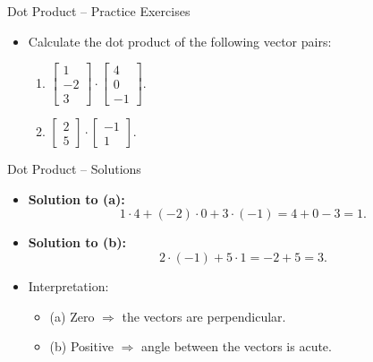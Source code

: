 \documentclass{beamer}
\begin{document}
\begin{frame}{Dot Product – Practice Exercises}
  \begin{itemize}
    \item Calculate the dot product of the following vector pairs:
    \begin{enumerate}
      \item $\begin{bmatrix} 1 \\ -2 \\ 3 \end{bmatrix} \cdot \begin{bmatrix} 4 \\ 0 \\ -1 \end{bmatrix}.$
      \item $\begin{bmatrix} 2 \\ 5 \end{bmatrix} \cdot \begin{bmatrix} -1 \\ 1 \end{bmatrix}.$
    \end{enumerate}
  \end{itemize}
\end{frame}

\begin{frame}{Dot Product – Solutions}
  \begin{itemize}
    \item \textbf{Solution to (a):}
    \[
    1 \cdot 4 + (-2) \cdot 0 + 3 \cdot (-1) = 4 + 0 - 3 = \boxed{1}.
    \]
    \item \textbf{Solution to (b):}
    \[
    2 \cdot (-1) + 5 \cdot 1 = -2 + 5 = \boxed{3}.
    \]
    \item Interpretation:
    \begin{itemize}
      \item (a) Zero \(\Rightarrow\) the vectors are perpendicular.
      \item (b) Positive \(\Rightarrow\) angle between the vectors is acute.
    \end{itemize}
  \end{itemize}
\end{frame}
\end{document}
